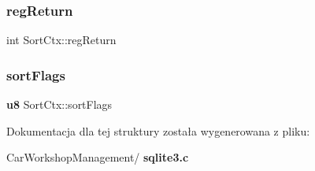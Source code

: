 \mbox{\label{struct_sort_ctx_a78017ace0acd29ba15652e389d9f90f6}} 
\subsubsection{regReturn}
{\footnotesize\ttfamily int Sort\+Ctx\+::reg\+Return}

\mbox{\label{struct_sort_ctx_aca4654bd8cf3789c3a1b05d144e3ce2c}} 
\subsubsection{sortFlags}
{\footnotesize\ttfamily \textbf{ u8} Sort\+Ctx\+::sort\+Flags}



Dokumentacja dla tej struktury została wygenerowana z pliku\+:\begin{DoxyCompactItemize}
\item 
Car\+Workshop\+Management/\textbf{ sqlite3.\+c}\end{DoxyCompactItemize}
